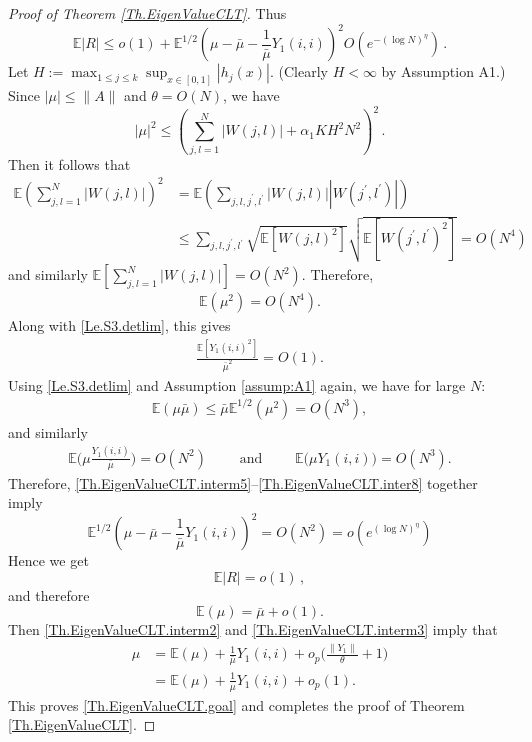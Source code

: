 \documentclass[11pt, reqno]{amsart}
\numberwithin{equation}{section}
\newcommand{\E}{\mbox{${\mathbb E}$}}
\begin{document}
\begin{proof}[Proof of Theorem \ref{Th.EigenValueCLT}]
Thus
\[
\mathbb E|R|\le o(1)+\mathbb E^{1/2}\left(\mu-\bar\mu-\frac1{\bar\mu}Y_1(i,i)\right)^2 O\left(e^{-(\log N)^\eta}\right)\,.
\]
Let $H := \max_{1 \le j \le k} \sup_{x \in[0,1]}|h_j(x)|$. (Clearly $H<\infty$ by Assumption A1.) Since $|\mu| \le \|A\|$ and $\theta=O(N)$, we have
\[
|\mu|^2 \le \left(\sum_{j,l =1}^N|W(j,l)| + \alpha_1 K H^2N^2\right)^2\,.
\]
Then it follows that
\begin{align*}
\mathbb E\left(\sum_{j,l =1}^N|W(j,l)|\right)^2 &= \mathbb E\left(\sum_{j,l,j^\prime,l^\prime}|W(j,l)||W(j^\prime,l^\prime)|\right)\\
&\le \sum_{j,l,j^\prime,l^\prime}\sqrt{\mathbb E [W(j,l)^2]}\sqrt{\mathbb E [W(j^\prime,l^\prime)^2]} = O(N^4)\,
\end{align*}
and similarly $\E\left[\sum_{j,l=1}^N |W(j,l)|\right] = O(N^2)$. Therefore,
\begin{align}\label{Th.EigenValueCLT.interm5}
\E(\mu^2) = O(N^4).
\end{align}
Along with \eqref{Le.S3.detlim}, this gives
\begin{align}\label{Th.EigenValueCLT.interm6}
\frac{\E[Y_1(i,i)^2]}{\bar{\mu}^2} = O(1).
\end{align}
Using \eqref{Le.S3.detlim} and Assumption \ref{assump:A1} again, we have for large $N$:
\begin{align}\label{Th.EigenValueCLT.interm7}
\E(\mu\bar{\mu}) \le \bar{\mu}\E^{1/2}(\mu^2) = O(N^3),
\end{align}
and similarly
\begin{align}\label{Th.EigenValueCLT.inter8}
\E\Big(\mu\frac{Y_1(i,i)}{\bar{\mu}}\Big) = O(N^2) \qquad \text{ and } \qquad \E\big(\mu Y_1(i,i)\big) = O(N^3).
\end{align}
Therefore, \eqref{Th.EigenValueCLT.interm5}–\eqref{Th.EigenValueCLT.inter8} together imply
\[
\mathbb E^{1/2}\left(\mu-\bar\mu-\frac1{\bar\mu}Y_1(i,i)\right)^2 = O(N^2) = o\left(e^{(\log N)^\eta}\right)
\]
Hence we get
\[
\mathbb E|R|=o(1)\,,
\]
and therefore
\begin{equation}\label{lim.mu0-mubar}
\E(\mu) = \bar{\mu} + o(1).
\end{equation}
Then \eqref{Th.EigenValueCLT.interm2} and \eqref{Th.EigenValueCLT.interm3} imply that
\begin{align*}
\mu &= \E(\mu) + \frac{1}{\bar{\mu}}Y_1(i,i) + o_p\Big(\frac{\|Y_1\|}{\theta} + 1\Big)\\
&= \E(\mu) + \frac{1}{\mu}Y_1(i,i) + o_p(1).
\end{align*}
This proves \eqref{Th.EigenValueCLT.goal} and completes the proof of Theorem \ref{Th.EigenValueCLT}.
\end{proof}
\end{document}
